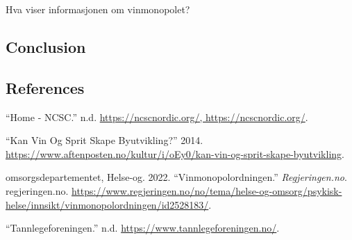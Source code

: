 \documentclass[
  10,
  a4paper,
]{article}
\newlength{\cslhangindent}
\newlength{\cslentryspacingunit} %
\newenvironment{CSLReferences}[2] %
 {%
  \setlength{\parindent}{0pt}
  \ifodd #1
  \let\oldpar\par
  \def\par{\hangindent=\cslhangindent\oldpar}
  \fi
  \setlength{\parskip}{#2\cslentryspacingunit}
 }%
 {}
\begin{document}
Hva viser informasjonen om vinmonopolet?

\hypertarget{conclusion}{%
\subsection{Conclusion}\label{conclusion}}

\hypertarget{references}{%
\subsection*{References}\label{references}}

\hypertarget{refs}{}
\begin{CSLReferences}{1}{0}
\leavevmode{}%
{``Home - NCSC.''} n.d.
\href{https://ncscnordic.org/,\%20https://ncscnordic.org/}{https://ncscnordic.org/,
https://ncscnordic.org/}.

\leavevmode{}%
{``Kan Vin Og Sprit Skape Byutvikling?''} 2014.
\url{https://www.aftenposten.no/kultur/i/oEy0/kan-vin-og-sprit-skape-byutvikling}.

\leavevmode{}%
omsorgsdepartementet, Helse-og. 2022. {``Vinmonopolordningen.''}
\emph{Regjeringen.no}. regjeringen.no.
\url{https://www.regjeringen.no/no/tema/helse-og-omsorg/psykisk-helse/innsikt/vinmonopolordningen/id2528183/}.

\leavevmode{}%
{``Tannlegeforeningen.''} n.d. \url{https://www.tannlegeforeningen.no/}.

\end{CSLReferences}
\end{document}
